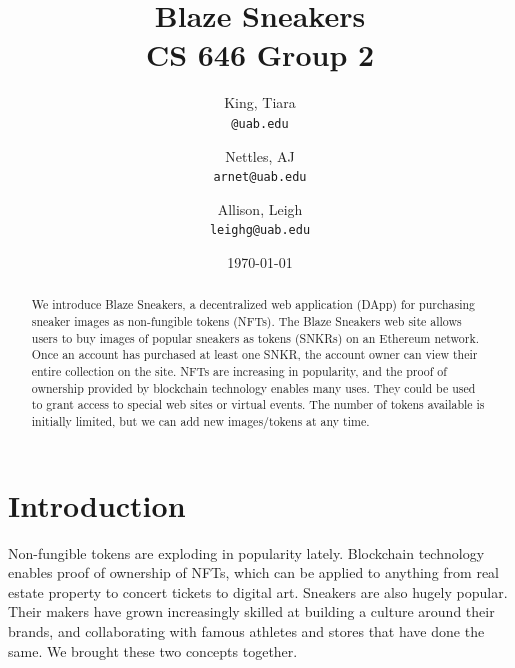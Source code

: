 \documentclass{article}
\begin{document}
\title{Blaze Sneakers\\CS 646 Group 2}
\date{\today}

\author{
  King, Tiara\\
  \texttt{@uab.edu}
  \and
  Nettles, AJ\\
  \texttt{arnet@uab.edu}
  \and
  Allison, Leigh\\
  \texttt{leighg@uab.edu}
}
\maketitle

\begin{abstract}
\noindent
    We introduce Blaze Sneakers, a decentralized web application (DApp) for purchasing sneaker images as non-fungible tokens (NFTs).
    The Blaze Sneakers web site allows users to buy images of popular sneakers as tokens (SNKRs) on an Ethereum network.
    Once an account has purchased at least one SNKR, the account owner can view their entire collection on the site.
    NFTs are increasing in popularity, and the proof of ownership provided by blockchain technology enables many uses.
    They could be used to grant access to special web sites or virtual events.
    The number of tokens available is initially limited, but we can add new images/tokens at any time.
\end{abstract}


\section{Introduction}
    Non-fungible tokens are exploding in popularity lately.
    Blockchain technology enables proof of ownership of NFTs, which can be applied to anything from 
    real estate property to concert tickets to digital art. 
    Sneakers are also hugely popular. 
    Their makers have grown increasingly skilled at building a culture around their brands, and collaborating with famous 
    athletes and stores that have done the same.
    We brought these two concepts together.
\end{document}
